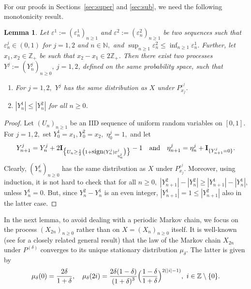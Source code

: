 \documentclass[12pt]{amsart}
\newtheorem{lemma}[theorem]{Lemma}
\begin{document}
For our proofs in Sections~\ref{sec:super} and \ref{sec:sub}, we
need the following monotonicity result.
\begin{lemma}
\label{lem:monot} Let ${\varepsilon}^1:=({\varepsilon}^1_n)_{n\ge 1}$ and
${\varepsilon}^2:=({\varepsilon}^2_n)_{n\ge 1}$ be two sequences such that
${\varepsilon}^j_n \in (0,1)$ for $j=1,2$ and $n\in{{\mathbb N}},$ and $\sup_{n\ge 1}
{\varepsilon}^2_n \le \inf_{n\ge 1} {\varepsilon}^1_n.$ Further, let $x_1,x_2\in
{{\mathbb Z}}_+$ be such that $x_2-x_1\in 2{{\mathbb Z}}_+$. Then there exist two
processes $Y^{j}:=(Y^j_n)_{n \ge 0},~j=1,2$, defined on the same
probability space, such that
\begin{enumerate}
\item For $j=1,2,$ $Y^j$ has the same distribution as $X$ under $P^{{\varepsilon}^j}_{x_j}$.
\item $|Y^1_n| \le |Y^2_n|$ for all $n\ge 0$.
\end{enumerate}
\end{lemma}
\begin{proof}
Let $(U_n)_{n\ge1}$ be an IID sequence of uniform random variables
on $[0,1]$. For $j=1,2,$ set $Y^1_0=x_1,Y^2_0=x_2,$ $\eta^j_0=1,$
and let \begin{eqnarray*} Y^{j}_{n+1}=Y^{j}_n+2{\mbox{\bf I}}_{\bigr\{U_n \ge \frac
12\bigl(1+\mbox{sign}(Y_n^j){\varepsilon}^j_{\eta^j_n}\bigr)\bigl\}}-1
\quad \mbox{and} \quad
\eta^{j}_{n+1}=\eta^j_n+{\mbox{\bf I}}_{\{Y^j_{n+1}=0\}}. \end{eqnarray*} Clearly,
$(Y_n^j)_{n\geq 0}$ has the same distribution as $X$ under
$P^{{\varepsilon}^j}_{x_j}$. Moreover, using induction, it is not hard to
check that for all $n\geq 0,$ $|Y^{2}_{n+1}|-|Y^2_{n}| \ge
|Y^1_{n+1}|-|Y^1_n|$, unless $Y^1_n=0.$ But, since $Y_n^2-Y_n^1$ is
an even integer, $|Y^1_{n+1}|=1\leq |Y^2_{n+1}|$ also in the latter
case.
\end{proof}
In the next lemma, to avoid dealing with a periodic Markov chain,
we focus on the process $(X_{2n})_{n\geq 0}$ rather than on
$X=(X_n)_{n\geq 0}$ itself. It is well-known (see \cite{borovkov} for a
closely related general result) that the law of the Markov chain $X_{2n}$
under $P^{(\delta)}$ converges to its unique stationary
distribution $\mu_\delta.$ The latter is given by
\begin{equation}
\label{eq:invmeas9} \mu_{\delta}(0)={\frac {\displaystyle {2\delta}}{\displaystyle {1+\delta} }},
\quad \mu_{\delta}(2i)= {\frac {\displaystyle {2\delta (1-\delta)}}{\displaystyle {(1+\delta)^3} }}
\Bigl(\frac{1-\delta}{1+\delta}\Bigr)^{2(|i|-1)},~i \in {{\mathbb Z}} \setminus \{0\}.
\end{equation}
\end{document}
